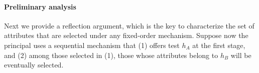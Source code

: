 
\paragraph{Preliminary analysis}
Next we provide a reflection argument, which is the key to characterize the set of attributes that are selected under any fixed-order mechanism. Suppose now the principal uses a sequential mechanism that (1) offers test $h_{A}$ at the first stage, and (2) among those
selected in (1), those whose attributes belong to $h_{B}$ will be eventually
selected.

